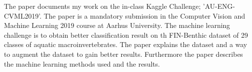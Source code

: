 The paper documents my work on the in-class Kaggle Challenge; 'AU-ENG-CVML2019'. The paper is a mandatory submission in the Computer Vision and Machine Learning 2019 course at Aarhus University. The machine learning challenge is to obtain better classification result on th FIN-Benthic dataset of 29 classes of aquatic macroinvertebrates. The paper explains the dataset and a way to augment the dataset to gain better results. Furthermore the paper describes the machine learning methods used and the results.